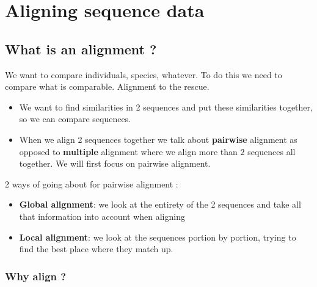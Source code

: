 \documentclass[
  11pt,
  twoside]{scrbook}
\begin{document}
\hypertarget{aligning-sequence-data}{%
\chapter{Aligning sequence data}\label{aligning-sequence-data}}

\hypertarget{what-is-an-alignment}{%
\section{What is an alignment ?}\label{what-is-an-alignment}}

We want to compare individuals, species, whatever. To do this we need to compare what is comparable. Alignment to the rescue.

\begin{itemize}
\item
  We want to find similarities in 2 sequences and put these similarities together, so we can compare sequences.
\item
  When we align 2 sequences together we talk about \textbf{pairwise} alignment as opposed to \textbf{multiple} alignment where we align more than 2 sequences all together. We will first focus on pairwise alignment.
\end{itemize}

2 ways of going about for pairwise alignment \autocite{sungAlgorithmsBioinformaticsPractical2011}:

\begin{itemize}
\item
  \textbf{Global alignment}: we look at the entirety of the 2 sequences and take all that information into account when aligning
\item
  \textbf{Local alignment}: we look at the sequences portion by portion, trying to find the best place where they match up.
\end{itemize}

\hypertarget{why-align}{%
\subsection{Why align ?}\label{why-align}}
\end{document}

